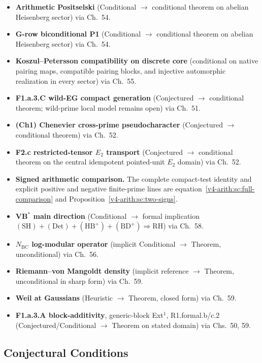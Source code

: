 \begin{itemize}
\item \textbf{Arithmetic Positselski} (Conditional \(\to\)
conditional theorem on abelian Heisenberg sector) via
Ch.~54.
\item \textbf{G-row biconditional P1} (Conditional \(\to\)
conditional theorem on abelian Heisenberg sector) via
Ch.~54.
\item \textbf{Koszul--Petersson compatibility on discrete core}
(conditional on native pairing maps, compatible pairing blocks,
and injective automorphic realization in every sector) via Ch.~55.
\item \textbf{F1.a.3.C wild-EG compact generation} (Conjectured
\(\to\) conditional theorem; wild-prime local model remains open) via
Ch.~51.
\item \textbf{(Ch1) Chenevier cross-prime pseudocharacter}
(Conjectured \(\to\) conditional theorem) via Ch.~52.
\item \textbf{F2.c restricted-tensor \(E_{2}\) transport}
(Conjectured \(\to\) conditional theorem on the central idempotent
pointed-unit \(E_{2}\) domain) via Ch.~52.
\item \textbf{Signed arithmetic comparison.} The complete compact-test
identity and explicit positive and negative finite-prime lines are
equation~\eqref{v4-arith:sc:full-comparison} and
Proposition~\ref{v4-arith:sc:two-signs}.
\item \textbf{VB\(^{*}\) main direction} (Conditional \(\to\)
formal implication
\((\mathrm{SH})+(\mathrm{Det})+(\mathrm{HB}^{+})+(\mathrm{BD}^{+})
\Rightarrow \mathrm{RH}\)) via Ch.~58.
\item \textbf{\(N_{\mathrm{BC}}\) log-modular operator} (implicit
Conditional \(\to\) Theorem, unconditional) via Ch.~56.
\item \textbf{Riemann--von Mangoldt density} (implicit reference
\(\to\) Theorem, unconditional in sharp form) via Ch.~59.
\item \textbf{Weil at Gaussians} (Heuristic \(\to\) Theorem, closed
form) via Ch.~59.
\item \textbf{F1.a.3.A block-additivity}, generic-block Ext\({}^{1}\),
R1.formal.b/c.2 (Conjectured/Conditional \(\to\) Theorem on
stated domain) via Chs.~50, 59.
\end{itemize}

\subsection{Conjectural Conditions}
\label{v4-arith:w5-synth:residual-conjectures}

